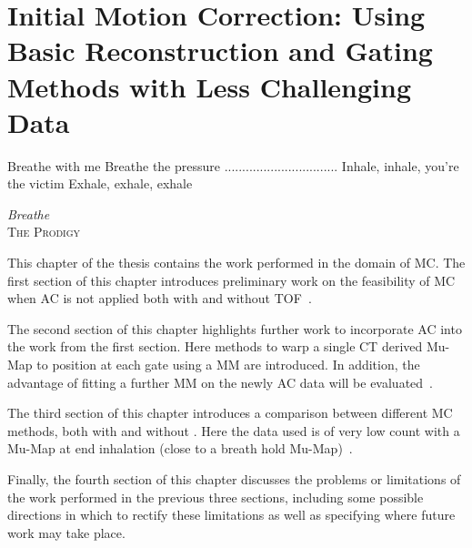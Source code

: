 \chapter{Initial Motion Correction: Using Basic Reconstruction and Gating Methods with Less Challenging Data} \label{sec:initial_motion_correction_using_basic_reconstruction_and_gating_methods_with_less_challenging_data}
    \vspace*{\fill}
    \setlength{\epigraphwidth}{0.4\linewidth}
    \renewcommand{\epigraphflush}{flushright}
    \renewcommand{\epigraphsize}{\footnotesize}
    \epigraph{Breathe with me\newline
              Breathe the pressure\newline
              ................................\newline
              Inhale, inhale, you're the victim\newline
              Exhale, exhale, exhale}%
              {\textit{Breathe}\\ \textsc{The Prodigy}}
    
    \newpage
    
        This chapter of the thesis contains the work performed in the domain of \gls{MC}. The first section of this chapter introduces preliminary work on the feasibility of \gls{MC} when \gls{AC} is not applied both with and without \gls{TOF}~\parencite{Whitehead2019ImpactPET}.
        
        The second section of this chapter highlights further work to incorporate \gls{AC} into the work from the first section. Here methods to warp a single \gls{CT} derived \gls{Mu-Map} to position at each gate using a \gls{MM} are introduced. In addition, the advantage of fitting a further \gls{MM} on the newly \gls{AC} data will be evaluated~\parencite{Whitehead2020PET/CTFields}.
        
        The third section of this chapter introduces a comparison between different \gls{MC} methods, both with and without . Here the data used is of very low count with a \gls{Mu-Map} at end inhalation (close to a breath hold \gls{Mu-Map})~\parencite{Whitehead2021ComparisonMap}.
        
        Finally, the fourth section of this chapter discusses the problems or limitations of the work performed in the previous three sections, including some possible directions in which to rectify these limitations as well as specifying where future work may take place.
    
